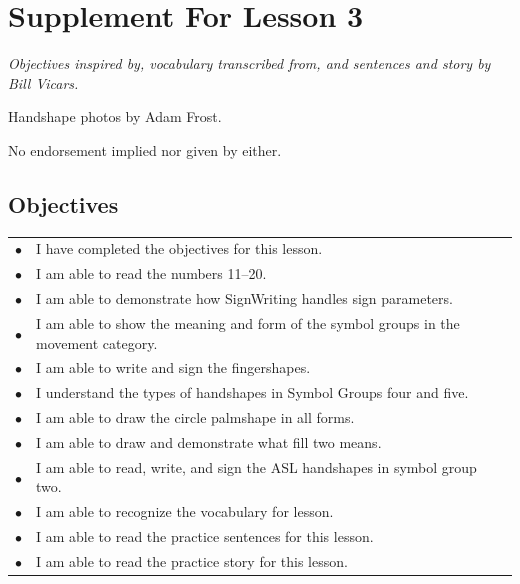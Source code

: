 \documentclass{article}
\begin{document}
\newfontfamily{}
\newfontfamily{}
\newcommand{\bul}{\hfil$\bullet$&}
\renewenvironment{glossary}{\begin{multicols}{5}\begin{center}}{\end{center}\end{multicols}}
\setcounter{secnumdepth}{0}
\setlength{\columnseprule}{1pt}

\section{Supplement For Lesson 3}

\begin{center}
\it
Objectives inspired by, vocabulary transcribed from, and sentences and story by Bill Vicars.

Handshape photos by Adam Frost.

No endorsement implied nor given by either.
\end{center}

\subsection{Objectives}

\begin{tabular}{p{1cm}p{14cm}}
\bul I have completed the objectives for this lesson.\\
\bul I am able to read the numbers 11--20.\\
\bul I am able to demonstrate how SignWriting handles sign parameters.\\
\bul I am able to show the meaning and form of the symbol groups in the movement category.\\
\bul I am able to write and sign the fingershapes.\\
\bul I understand the types of handshapes in Symbol Groups four and five.\\
\bul I am able to draw the circle palmshape in all forms.\\
\bul I am able to draw and demonstrate what fill two means.\\
\bul I am able to read, write, and sign the ASL handshapes in symbol group two.\\
\bul I am able to recognize the vocabulary for lesson.\\
\bul I am able to read the practice sentences for this lesson.\\
\bul I am able to read the practice story for this lesson.\\
\end{tabular}
\end{document}
